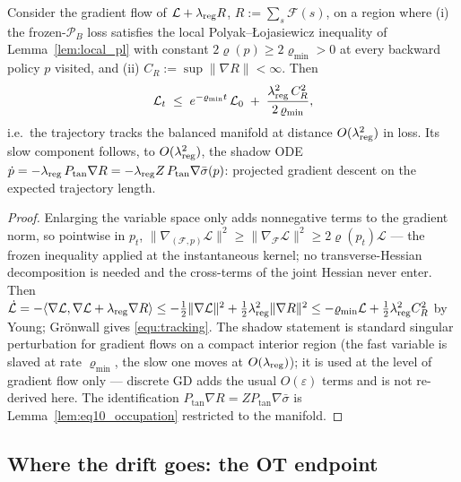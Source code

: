 \begin{proposition}\label{prop:two_timescale}
Consider the gradient flow of $\mathcal L + \lambda_{\mathrm{reg}} R$, $R := \sum_s
\mathcal F(s)$, on a region where (i) the frozen-$\mathcal P_B$ loss satisfies the local
Polyak--{\L}ojasiewicz inequality of Lemma~\ref{lem:local_pl} with constant
$2\varrho(p)\geq2\varrho_{\min}>0$ at every backward policy $p$ visited, and (ii)
$C_R:=\sup\|\nabla R\|<\infty$. Then
\begin{equation}\label{equ:tracking}
    \mathcal L_t \;\leq\; e^{-\varrho_{\min} t}\,\mathcal L_0
    \;+\; \frac{\lambda_{\mathrm{reg}}^2\,C_R^2}{2\,\varrho_{\min}} ,
\end{equation}
i.e.\ the trajectory tracks the balanced manifold at distance $O(\lambda_{\mathrm{reg}}^2)$
in loss. Its slow component follows, to $O(\lambda_{\mathrm{reg}}^2)$, the shadow ODE
$\dot p = -\lambda_{\mathrm{reg}}\,P_{\mathrm{tan}}\nabla R = -\lambda_{\mathrm{reg}} Z\,
P_{\mathrm{tan}}\nabla\bar\sigma(p)$: projected gradient descent on the expected
trajectory length.
\end{proposition}

\begin{proof}
Enlarging the variable space only adds nonnegative terms to the gradient norm, so
pointwise in $p_t$, $\|\nabla_{(\mathcal F,p)}\mathcal L\|^2 \geq
\|\nabla_{\mathcal F}\mathcal L\|^2 \geq 2\varrho(p_t)\mathcal L$ --- the frozen
inequality applied at the instantaneous kernel; no transverse-Hessian decomposition is
needed and the cross-terms of the joint Hessian never enter. Then
$\dot{\mathcal L} = -\langle\nabla\mathcal L, \nabla\mathcal L +
\lambda_{\mathrm{reg}}\nabla R\rangle \leq -\tfrac12\|\nabla\mathcal L\|^2 +
\tfrac12\lambda_{\mathrm{reg}}^2\|\nabla R\|^2 \leq -\varrho_{\min}\mathcal L +
\tfrac12\lambda_{\mathrm{reg}}^2C_R^2$ by Young; Gr\"onwall gives \eqref{equ:tracking}.
The shadow statement is standard singular perturbation for gradient flows on a compact
interior region (the fast variable is slaved at rate $\varrho_{\min}$, the slow one moves
at $O(\lambda_{\mathrm{reg}})$); it is used at the level of gradient flow only ---
discrete GD adds the usual $O(\varepsilon)$ terms and is not re-derived here. The
identification $P_{\mathrm{tan}}\nabla R = Z P_{\mathrm{tan}}\nabla\bar\sigma$ is
Lemma~\ref{lem:eq10_occupation} restricted to the manifold.
\end{proof}

\subsection{Where the drift goes: the OT endpoint}\label{sec:drift_target}


